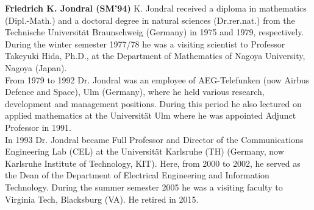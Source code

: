 \documentclass[journal, twocolumn]{IEEEtran}
\begin{document}
\begin{IEEEbiography}
{\textbf{Friedrich K. Jondral (SM'94)}} K. Jondral received a diploma in mathematics (Dipl.-Math.) and a doctoral degree in natural sciences (Dr.rer.nat.) from the Technische Universität Braunschweig (Germany) in 1975 and 1979, respectively. During the winter semester 1977/78 he was a visiting scientist to Professor Takeyuki Hida, Ph.D., at the Department of Mathematics of Nagoya University, Nagoya (Japan). \\
From 1979 to 1992 Dr. Jondral was an employee of AEG-Telefunken (now Airbus Defence and Space), Ulm (Germany), where he held various research, development and management positions. During this period he also lectured on applied mathematics at the Universität Ulm where he was appointed Adjunct Professor in 1991. \\
In 1993 Dr. Jondral became Full Professor and Director of the Communications Engineering Lab (CEL) at the Universität Karlsruhe (TH) (Germany, now Karlsruhe Institute of Technology, KIT). Here, from 2000 to 2002, he served as the Dean of the Department of Electrical Engineering and Information Technology. During the summer semester 2005 he was a visiting faculty to Virginia Tech, Blacksburg (VA). He retired in 2015. 
\end{IEEEbiography}

\end{document}
